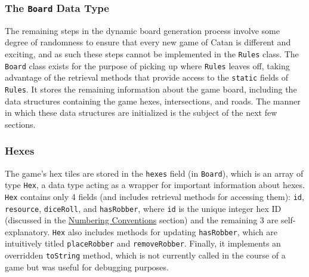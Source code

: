 \documentclass[pageno]{jpaper}
\begin{document}
\begin{doublespacing}
\subsubsection{The \lstinline$Board$ Data Type}

The remaining steps in the dynamic board generation process involve some degree of randomness to ensure that every new game of Catan is different and exciting, and as such these steps cannot be implemented in the \lstinline$Rules$ class. The \lstinline$Board$ class exists for the purpose of picking up where \lstinline$Rules$ leaves off, taking advantage of the retrieval methods that provide access to the \lstinline$static$ fields of \lstinline$Rules$. It stores the remaining information about the game board, including the data structures containing the game hexes, intersections, and roads. The manner in which these data structures are initialized is the subject of the next few sections.

\hypertarget{sec:hexes}{}
\subsubsection{Hexes}

The game's hex tiles are stored in the \lstinline$hexes$ field (in \lstinline$Board$), which is an array of type \lstinline$Hex$, a data type acting as a wrapper for important information about hexes. \lstinline$Hex$ contains only 4 fields (and includes retrieval methods for accessing them): \lstinline$id$, \lstinline$resource$, \lstinline$diceRoll$, and \lstinline$hasRobber$, where \lstinline$id$ is the unique integer hex ID (discussed in the \hyperlink{sec:numbering_conventions}{Numbering Conventions} section) and the remaining 3 are self-explanatory. \lstinline$Hex$ also includes methods for updating \lstinline$hasRobber$, which are intuitively titled \lstinline$placeRobber$ and \lstinline$removeRobber$. Finally, it implements an overridden \lstinline$toString$ method, which is not currently called in the course of a game but was useful for debugging purposes.


\end{doublespacing}
\end{document}
